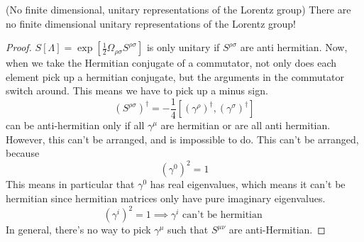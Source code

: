 \begin{thm}{(No finite dimensional, unitary representations of the Lorentz group)} 
There are no finite dimensional unitary representations of the Lorentz group! 

\begin{proof} 
$ S [ \Lambda ]  = \exp \left[  \frac{1}{2 } \Omega_{ \rho \sigma } 
S ^{ \rho \sigma } \right]  $ is only unitary if $ S ^{ \rho \sigma } $ are 
anti hermitian. Now, when we take the Hermitian conjugate 
of a commutator, not only does each element pick up a 
hermitian conjugate, but the arguments in the commutator switch around. 
This means we have to pick up a minus sign. 
\[
	( S ^{ \rho \sigma } ) ^ \dagger  = -  \frac{1}{4 } [ ( \gamma ^ \rho ) ^ \dagger , 
	( \gamma ^ \sigma ) ^ \dagger ] 
\] can be anti-hermitian only if all $ \gamma ^ \mu $ are hermitian or are all anti hermitian. 
However, this can't be arranged, and is impossible to do. 
This can't be arranged, because
\[
 ( \gamma ^ 0 ) ^ 2 = 1 \] 
 This means in particular that $ \gamma ^ 0 $ has real eigenvalues, 
 which means it can't be hermitian since hermitian matrices 
 only have pure imaginary eigenvalues. 
\[
 ( \gamma ^ i ) ^ 2 = 1 \implies \gamma ^ i \text{ can't be hermitian }
\] In general, there's no way to pick $ \gamma ^ \mu $  such that $ S ^{ \mu \nu } $ 
are anti-Hermitian.
\end{proof} 
\end{thm} 

